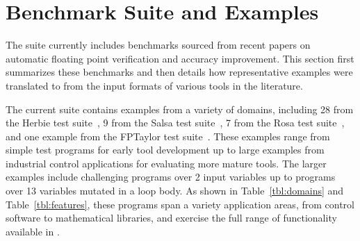 \documentclass[main.tex]{subfiles}
\begin{document}
\section{Benchmark Suite and Examples}
\label{sec:case-studies}

The \name suite currently includes \nbenches benchmarks
  sourced from recent papers on automatic floating point
  verification and accuracy improvement.
This section first summarizes these benchmarks
  and then details how representative examples
  were translated to \name from the input formats
  of various tools in the literature.



The current \name suite contains
  examples from a variety of domains, including
  28 from the Herbie test suite~\cite{pavel15},
  9 from the Salsa test suite~\cite{fmics15},
  7 from the Rosa test suite~\cite{DarulovaK14},
  and one example from the FPTaylor test suite~\cite{fptaylor-fm15}.
These examples range from simple test programs for
  early tool development up to
  large examples from industrial control applications for
  evaluating more mature tools.
The larger examples include challenging
  programs over 2 input variables up to
  programs over 13 variables mutated in a loop body.
As shown in Table~\ref{tbl:domains} and Table~\ref{tbl:features},
  these programs span a variety application areas,
  from control software to mathematical libraries,
  and exercise the full range of functionality
  available in \name.
\end{document}
